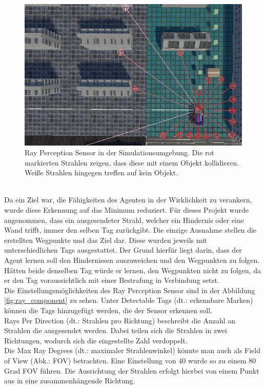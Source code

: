 \begin{figure} [ht]
	\centering
	\includegraphics[width=\linewidth,height=\textheight,keepaspectratio]{img/ray_sensor_agent}
	\caption[Ray Perception Sensor in Simulation]{Ray Perception Sensor in der Simulationsumgebung. Die rot markierten Strahlen zeigen, dass diese mit einem Objekt kollidieren. Weiße Strahlen hingegen treffen auf kein Objekt.}
	\label{fig:ray_sensor}
\end{figure}
\\
Da ein Ziel war, die Fähigkeiten des Agenten in der Wirklichkeit zu verankern, wurde diese Erkennung auf das Minimum reduziert. Für dieses Projekt wurde angenommen, dass ein ausgesendeter Strahl, welcher ein Hindernis oder eine Wand trifft, immer den selben Tag zurückgibt. Die einzige Ausnahme stellen die erstellten Wegpunkte und das Ziel dar. Diese wurden jeweils mit unterschiedlichen Tags ausgestattet. Der Grund hierfür liegt darin, dass der Agent lernen soll den Hindernissen auszuweichen und den Wegpunkten zu folgen. Hätten beide denselben Tag würde er lernen, den Wegpunkten nicht zu folgen, da er den Tag voraussichtlich mit einer Bestrafung in Verbindung setzt. 
\\
Die Einstellungsmöglichkeiten des Ray Perception Sensor sind in der Abbildung \ref{fig:ray_component} zu sehen. Unter Detectable Tags (dt.: erkennbare Marken) können die Tags hinzugefügt werden, die der Sensor erkennen soll. 
\\
Rays Per Direction (dt.: Strahlen pro Richtung) beschreibt die Anzahl an Strahlen die ausgesendet werden. Dabei teilen sich die Strahlen in zwei Richtungen, wodurch sich die eingestellte Zahl verdoppelt.
\\
Die Max Ray Degrees (dt.: maximaler Strahlenwinkel) könnte man auch als Field of View (Abk.: FOV) betrachten. Eine Einstellung von 40 wurde so zu einem 80 Grad FOV führen. Die Ausrichtung der Strahlen erfolgt hierbei von einem Punkt aus in eine zusammenhängende Richtung.
